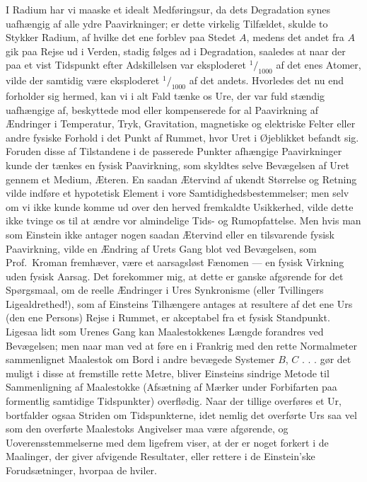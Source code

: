 \documentclass[12pt,a4paper]{article}
\newcommand{\opage}[1]{\marginnote{\footnotesize\textit{[#1]}}}
\begin{document}
I Radium har vi maaske et idealt Medføringsur, da dets Degradation synes
uafhængig af alle ydre Paavirkninger; er dette virkelig Tilfældet, skulde to
Stykker Radium, af hvilke det ene forblev paa Stedet $A$, medens det andet fra
$A$ gik paa Rejse ud i Verden, stadig følges ad i Degradation, saaledes at naar
der paa et vist Tidspunkt efter Adskillelsen var eksploderet
$^{1}\!/_{1000}$ af det enes Atomer, vilde der samtidig være eksploderet
$^{1}\!/_{1000}$ af det andets. Hvorledes det nu end forholder sig hermed, kan
vi i alt Fald tænke os Ure, der var fuld\-%
\opage{6}stændig uafhængige af, beskyttede mod eller kompenserede for al Paavirkning af
Ændringer i Temperatur, Tryk, Gravitation, magnetiske og elektriske Felter
eller andre fysiske Forhold i det Punkt af Rummet, hvor Uret i Øjeblikket
befandt sig. Foruden disse af Tilstandene i de passerede Punkter afhængige
Paavirkninger kunde der tænkes en fysisk Paavirkning, som skyldtes selve
Bevægelsen af Uret gennem et Medium, Æteren. En saadan \guillemotleft
Ætervind\guillemotright{} af ukendt Størrelse og Retning vilde indføre et
hypotetisk Element i vore Samtidighedsbestemmelser; men selv om vi ikke kunde
komme ud over den herved fremkaldte Usikkerhed, vilde dette ikke tvinge os til
at ændre vor almindelige Tids- og Rumopfattelse. Men hvis man som Einstein ikke
antager nogen saadan Ætervind eller en tilsvarende fysisk Paavirkning, vilde en
Ændring af Urets Gang blot ved Bevægelsen, som Prof.\ Kroman fremhæver, være
\guillemotleft et aarsagsløst Fænomen\guillemotright{} --- en fysisk Virkning
uden fysisk Aarsag. Det forekommer mig, at dette er ganske afgørende for det
Spørgsmaal, om de reelle Ændringer i Ures Synkronisme (eller Tvillingers
Ligealdrethed!), som af Einsteins Tilhængere antages at resultere af det ene
Urs (den ene Persons) Rejse i Rummet, er akceptabel fra et fysisk Standpunkt.
Ligesaa lidt som Urenes Gang kan Maalestokkenes Længde forandres ved
Bevægelsen; men naar man ved at føre en i Frankrig med den rette Normalmeter
sammenlignet Maalestok \guillemotleft om Bord\guillemotright{} i andre bevægede
Systemer $B$, $C$ . . . gør det muligt i disse at fremstille rette Metre,
bliver Einsteins sindrige Metode til Sammenligning af Maalestokke (Afsætning af
Mærker under Forbifarten paa formentlig samtidige Tidspunkter) overflødig. Naar
der tillige overføres et Ur, bortfalder ogsaa Striden om Tidspunkterne, idet
nemlig det overførte Urs saa vel som den overførte Maalestoks Angivelser maa
være afgørende, og Uoverensstemmelserne med dem ligefrem viser, at der er noget
forkert i de Maalinger, der giver afvigende Resultater, eller rettere i de
Einstein'ske Forudsætninger, hvorpaa de hviler.
\end{document}
